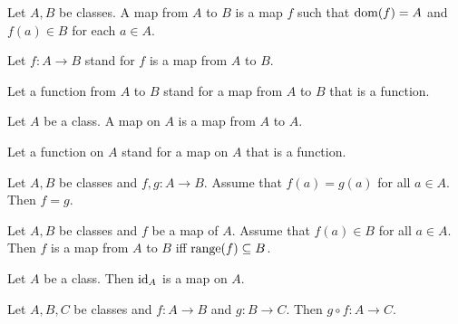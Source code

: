 \documentclass[10pt]{article}
\begin{document}
  \begin{forthel}
    \begin{definition}
      Let $A, B$ be classes.
      A map from $A$ to $B$ is a map $f$ such that $\operatorname{dom}(f) = A$ and
      $f(a) \in B$ for each $a \in A$.
    \end{definition}

    Let $f: A \to B$ stand for $f$ is a map from $A$ to $B$.

    Let a function from $A$ to $B$ stand for a map from $A$ to $B$ that is a function.
  \end{forthel}

  \begin{forthel}
    \begin{definition}
      Let $A$ be a class.
      A map on $A$ is a map from $A$ to $A$.
    \end{definition}

    Let a function on $A$ stand for a map on $A$ that is a function.
  \end{forthel}

  \begin{forthel}
    \begin{proposition}
      Let $A, B$ be classes and $f, g : A \to B$.
      Assume that $f(a) = g(a)$ for all $a \in A$.
      Then $f = g$.
    \end{proposition}
  \end{forthel}

  \begin{forthel}
    \begin{proposition}
      Let $A, B$ be classes and $f$ be a map of $A$.
      Assume that $f(a) \in B$ for all $a \in A$.
      Then $f$ is a map from $A$ to $B$ iff $\textrm{range}(f) \subseteq B$.
    \end{proposition}
  \end{forthel}

  \begin{forthel}
    \begin{proposition}
      Let $A$ be a class.
      Then $\textrm{id}_{A}$ is a map on $A$.
    \end{proposition}
  \end{forthel}

  \begin{forthel}
    \begin{proposition}
      Let $A, B, C$ be classes and $f : A \to B$ and $g : B \to C$.
      Then $g \circ f : A \to C$.
    \end{proposition}
  \end{forthel}
\end{document}
